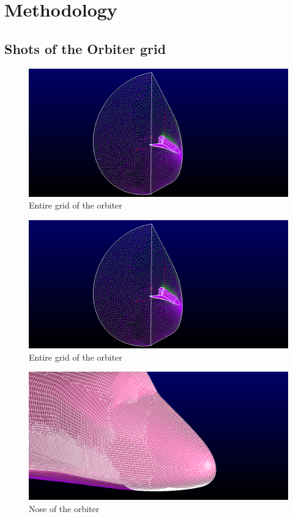 \section{Methodology}

\subsection{Shots of the Orbiter grid}


\begin{figure}[ht!]
 \centering
 \includegraphics[width=\textwidth]{report_images/ss_entire_grid.png}
 \caption{Entire grid of the orbiter}
 \label{fig: ss_entire_grid}
\end{figure}

\begin{figure}[H]
 \centering
 \includegraphics[width=\textwidth]{report_images/ss_surface_grid.png}
 \caption{Entire grid of the orbiter}
 \label{fig: ss_entire_grid}
\end{figure}

\begin{figure}[H]
 \centering
 \includegraphics[width=\textwidth]{report_images/ss_nose_LE.png}
 \caption{Nose of the orbiter}
 \label{fig: ss_nose_LE}
\end{figure}

